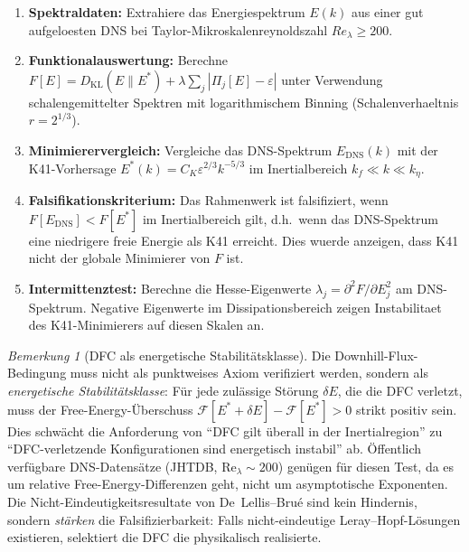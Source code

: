 \documentclass[12pt,a4paper]{article}
\theoremstyle{definition}
\theoremstyle{plain}
\theoremstyle{remark}
\newtheorem{remark}[definition]{Bemerkung}
\begin{document}
\begin{enumerate}
\item \textbf{Spektraldaten:} Extrahiere das Energiespektrum $E(k)$ aus einer gut aufgeloesten DNS bei Taylor-Mikroskalenreynoldszahl $Re_\lambda \geq 200$.

\item \textbf{Funktionalauswertung:} Berechne $F[E] = D_{\mathrm{KL}}(E \| E^*) + \lambda \sum_j |\Pi_j[E] - \varepsilon|$ unter Verwendung schalengemittelter Spektren mit logarithmischem Binning (Schalenverhaeltnis $r = 2^{1/3}$).

\item \textbf{Minimierervergleich:} Vergleiche das DNS-Spektrum $E_{\mathrm{DNS}}(k)$ mit der K41-Vorhersage $E^*(k) = C_K \varepsilon^{2/3} k^{-5/3}$ im Inertialbereich $k_f \ll k \ll k_\eta$.

\item \textbf{Falsifikationskriterium:} Das Rahmenwerk ist falsifiziert, wenn $F[E_{\mathrm{DNS}}] < F[E^*]$ im Inertialbereich gilt, d.h.\ wenn das DNS-Spektrum eine niedrigere freie Energie als K41 erreicht. Dies wuerde anzeigen, dass K41 nicht der globale Minimierer von $F$ ist.

\item \textbf{Intermittenztest:} Berechne die Hesse-Eigenwerte $\lambda_j = \partial^2 F / \partial E_j^2$ am DNS-Spektrum. Negative Eigenwerte im Dissipationsbereich zeigen Instabilitaet des K41-Minimierers auf diesen Skalen an.
\end{enumerate}

\begin{remark}[DFC als energetische Stabilit\"atsklasse]\label{rem:dfc-stability}
Die Downhill-Flux-Bedingung muss nicht als punktweises Axiom verifiziert werden, sondern als \emph{energetische Stabilit\"atsklasse}: F\"ur jede zul\"assige St\"orung $\delta E$, die die DFC verletzt, muss der Free-Energy-\"Uberschuss $\mathcal{F}[E^* + \delta E] - \mathcal{F}[E^*] > 0$ strikt positiv sein. Dies schw\"acht die Anforderung von "`DFC gilt \"uberall in der Inertialregion"' zu "`DFC-verletzende Konfigurationen sind energetisch instabil"' ab. \"Offentlich verf\"ugbare DNS-Datens\"atze (JHTDB, $\mathrm{Re}_\lambda \sim 200$) gen\"ugen f\"ur diesen Test, da es um relative Free-Energy-Differenzen geht, nicht um asymptotische Exponenten. Die Nicht-Eindeutigkeitsresultate von De~Lellis--Bru\'e \cite{DeLellisBrue2024} sind kein Hindernis, sondern \emph{st\"arken} die Falsifizierbarkeit: Falls nicht-eindeutige Leray--Hopf-L\"osungen existieren, selektiert die DFC die physikalisch realisierte.
\end{remark}
\end{document}
